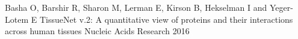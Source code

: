 \begin{cventries}
  \cventry
    {Basha O, Barshir R, Sharon M, Lerman E, Kirson B, Hekselman I and Yeger-Lotem E}
    {TissueNet v.2: A quantitative view of proteins and their interactions across human tissues}
    {Nucleic Acids Research}
    {2016}
    {
      \begin{cvitems}
      \end{cvitems}
    }
\end{cventries}

